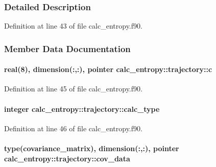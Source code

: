 \subsubsection{Detailed Description}


Definition at line 43 of file calc\-\_\-entropy.\-f90.



\subsubsection{Member Data Documentation}
\hypertarget{structcalc__entropy_1_1trajectory_a5287f1d835929acc0a274bd7ac677b31}{
\paragraph[{c}]{\setlength{\rightskip}{0pt plus 5cm}real(8), dimension(\-:,\-:), pointer calc\-\_\-entropy\-::trajectory\-::c}}\label{structcalc__entropy_1_1trajectory_a5287f1d835929acc0a274bd7ac677b31}


Definition at line 45 of file calc\-\_\-entropy.\-f90.

\hypertarget{structcalc__entropy_1_1trajectory_af9701f485b447a73af43d4551edcf1ee}{
\paragraph[{calc\-\_\-type}]{\setlength{\rightskip}{0pt plus 5cm}integer calc\-\_\-entropy\-::trajectory\-::calc\-\_\-type}}\label{structcalc__entropy_1_1trajectory_af9701f485b447a73af43d4551edcf1ee}


Definition at line 46 of file calc\-\_\-entropy.\-f90.

\hypertarget{structcalc__entropy_1_1trajectory_a16a9b8565b51240772698613492b4c37}{
\paragraph[{cov\-\_\-data}]{\setlength{\rightskip}{0pt plus 5cm}type({\bf covariance\-\_\-matrix}), dimension(\-:,\-:), pointer calc\-\_\-entropy\-::trajectory\-::cov\-\_\-data}}\label{structcalc__entropy_1_1trajectory_a16a9b8565b51240772698613492b4c37}


